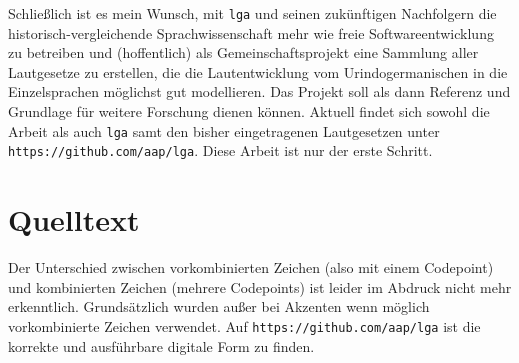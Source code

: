 \documentclass[12pt,a4paper,normalheadings,bibliography=totoc]{scrartcl}
\def\tt#1{\texttt{#1}}
\begin{document}
Schließlich ist es mein Wunsch, mit \tt{lga} und seinen zukünftigen Nachfolgern
die historisch-vergleichende Sprachwissenschaft
mehr wie freie Softwareentwicklung zu betreiben
und (hoffentlich) als Gemeinschaftsprojekt eine Sammlung aller Lautgesetze zu erstellen,
die die Lautentwicklung vom Urindogermanischen in die Einzelsprachen
möglichst gut modellieren.
Das Projekt soll als dann Referenz und Grundlage für weitere Forschung dienen können.
Aktuell findet sich sowohl die Arbeit als auch
\tt{lga} samt den bisher eingetragenen Lautgesetzen unter 
\tt{https://github.com/aap/lga}.
Diese Arbeit ist nur der erste Schritt.

\nocite{beekes}
\printbibliography

\appendix

\section{Quelltext}

Der Unterschied zwischen vorkombinierten Zeichen (also mit einem Codepoint)
und kombinierten Zeichen (mehrere Codepoints)
ist leider im Abdruck nicht mehr erkenntlich.
Grundsätzlich wurden außer bei Akzenten
wenn möglich vorkombinierte Zeichen verwendet.
Auf
\tt{https://github.com/aap/lga}
ist die korrekte und ausführbare digitale Form zu finden.


\end{document}
